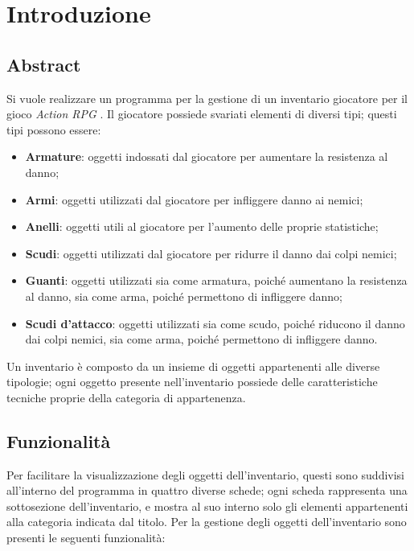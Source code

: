 \section{Introduzione}
\subsection{Abstract}
Si vuole realizzare un programma per la gestione di un inventario giocatore per il gioco \textit{Action RPG} . Il giocatore possiede svariati elementi di diversi tipi; questi tipi possono essere:
\begin{itemize}
  \item \textbf{Armature}: oggetti indossati dal giocatore per aumentare la resistenza al danno;
  \item \textbf{Armi}: oggetti utilizzati dal giocatore per infliggere danno ai nemici;
  \item \textbf{Anelli}: oggetti utili al giocatore per l'aumento delle proprie statistiche;
  \item \textbf{Scudi}: oggetti utilizzati dal giocatore per ridurre il danno dai colpi nemici;
  \item \textbf{Guanti}: oggetti utilizzati sia come armatura, poiché aumentano la resistenza al danno, sia come arma, poiché permettono di infliggere danno;
  \item \textbf{Scudi d'attacco}: oggetti utilizzati sia come scudo, poiché riducono il danno dai colpi nemici, sia come arma, poiché permettono di infliggere danno.
\end{itemize}

Un inventario è composto da un insieme di oggetti appartenenti alle diverse tipologie; ogni oggetto presente nell'inventario possiede delle caratteristiche tecniche proprie della categoria di appartenenza.


\subsection{Funzionalità}
Per facilitare la visualizzazione degli oggetti dell'inventario, questi sono suddivisi all'interno del programma in quattro diverse schede; ogni scheda rappresenta una sottosezione dell'inventario, e mostra al suo interno solo gli elementi appartenenti alla categoria indicata dal titolo. Per la gestione degli oggetti dell'inventario sono presenti le seguenti funzionalità:

